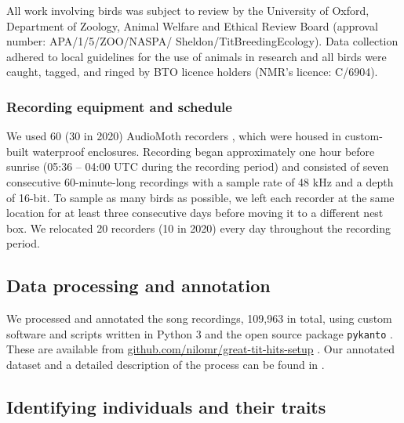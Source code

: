All work involving birds was subject to review by the University of Oxford, Department of Zoology, Animal Welfare and Ethical Review Board (approval number: APA/1/5/ZOO/NASPA/ Sheldon/TitBreedingEcology). Data collection adhered to local guidelines for the use of animals in research and all birds were caught, tagged, and ringed by BTO licence holders (NMR’s licence: C/6904).

\subsubsection{Recording equipment and schedule}
We used 60 (30 in 2020) AudioMoth recorders \parencite{hill2019}, which were housed in custom-built waterproof enclosures. Recording began approximately one hour before sunrise (05:36 – 04:00 UTC during the recording period) and consisted of seven consecutive 60-minute-long recordings with a sample rate of 48 kHz and a depth of 16-bit. To sample as many birds as possible, we left each recorder at the same location for at least three consecutive days before moving it to a different nest box. We relocated 20 recorders (10 in 2020) every day throughout the recording period.

\subsection{Data processing and annotation}

We processed and annotated the song recordings, 109,963 in total, using custom software and scripts written in Python 3 \parencite{vanrossum1995} and the open source package \texttt{pykanto} \parencite{merinorecalde2023}. These are available from \href{https://github.com/nilomr/great-tit-hits-setup}{github.com/nilomr/great-tit-hits-setup} \parencite{nilo_gretidataset_setup_2023}. Our annotated dataset and a detailed description of the process can be found in \textcite{merinorecalde2023a}.

\subsection{Identifying individuals and their traits}

